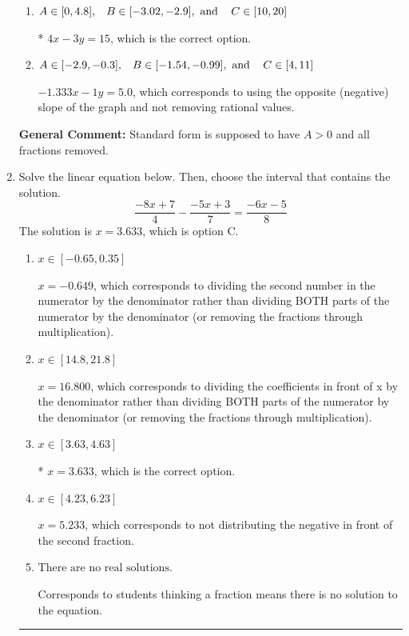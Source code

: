 \documentclass{extbook}[14pt]
\newcommand{\litem}[1]{\item #1

\rule{\textwidth}{0.4pt}}
\begin{document}
\begin{enumerate}
{\begin{enumerate}[label=\Alph*.]
 $4x + 3y = -15$, which corresponds to using the opposite (negative) slope of the graph, but did everything else correctly.
\item \( A \in [0, 4.8], \hspace{3mm} B \in [-3.02, -2.9], \text{ and } \hspace{3mm} C \in [10, 20] \)

* $4x - 3y = 15$, which is the correct option.
\item \( A \in [-2.9, -0.3], \hspace{3mm} B \in [-1.54, -0.99], \text{ and } \hspace{3mm} C \in [4, 11] \)

 $-1.333x - 1y = 5.0$, which corresponds to using the opposite (negative) slope of the graph and not removing rational values.
\end{enumerate}

\textbf{General Comment:} Standard form is supposed to have $A > 0$ and all fractions removed.
}
\litem{
Solve the linear equation below. Then, choose the interval that contains the solution.
\[ \frac{-8x + 7}{4} - \frac{-5x + 3}{7} = \frac{-6x -5}{8} \]The solution is \( x = 3.633 \), which is option C.\begin{enumerate}[label=\Alph*.]
\item \( x \in [-0.65, 0.35] \)

 $x = -0.649$, which corresponds to dividing the second number in the numerator by the denominator rather than dividing BOTH parts of the numerator by the denominator (or removing the fractions through multiplication).
\item \( x \in [14.8, 21.8] \)

 $x = 16.800$, which corresponds to dividing the coefficients in front of x by the denominator rather than dividing BOTH parts of the numerator by the denominator (or removing the fractions through multiplication).
\item \( x \in [3.63, 4.63] \)

* $x = 3.633$, which is the correct option.
\item \( x \in [4.23, 6.23] \)

 $x = 5.233$, which corresponds to not distributing the negative in front of the second fraction.
\item \( \text{There are no real solutions.} \)

Corresponds to students thinking a fraction means there is no solution to the equation.
\end{enumerate}

}
\end{enumerate}
\end{document}
